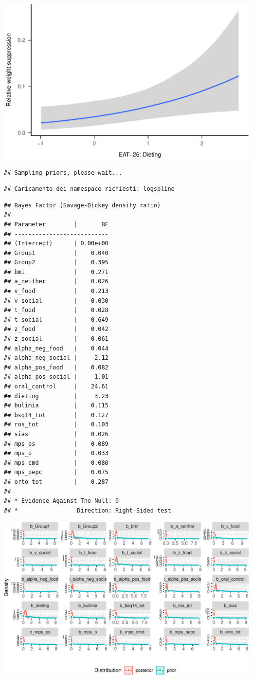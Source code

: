 \documentclass[
]{article}
\begin{document}
\includegraphics{046_weight_history_alpha_files/figure-latex/unnamed-chunk-9-5.pdf}

\begin{verbatim}
## Sampling priors, please wait...
\end{verbatim}

\begin{verbatim}
## Caricamento dei namespace richiesti: logspline
\end{verbatim}

\begin{verbatim}
## Bayes Factor (Savage-Dickey density ratio)
## 
## Parameter        |       BF
## ---------------------------
## (Intercept)      | 0.00e+00
## Group1           |    0.040
## Group2           |    0.395
## bmi              |    0.271
## a_neither        |    0.026
## v_food           |    0.213
## v_social         |    0.030
## t_food           |    0.028
## t_social         |    0.649
## z_food           |    0.042
## z_social         |    0.061
## alpha_neg_food   |    0.044
## alpha_neg_social |     2.12
## alpha_pos_food   |    0.082
## alpha_pos_social |     1.01
## oral_control     |    24.61
## dieting          |     3.23
## bulimia          |    0.115
## bsq14_tot        |    0.127
## ros_tot          |    0.103
## sias             |    0.026
## mps_ps           |    0.089
## mps_o            |    0.033
## mps_cmd          |    0.080
## mps_pepc         |    0.075
## orto_tot         |    0.287
## 
## * Evidence Against The Null: 0
## *                 Direction: Right-Sided test
\end{verbatim}

\includegraphics{046_weight_history_alpha_files/figure-latex/unnamed-chunk-9-6.pdf}
\end{document}
